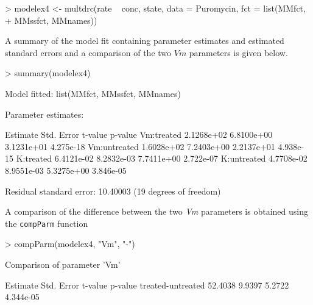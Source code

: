 \documentclass[a4paper]{article}
\begin{document}
\begin{Schunk}
\begin{Sinput}
> modelex4 <- multdrc(rate ~ conc, state, data = Puromycin, fct = list(MMfct, 
+     MMssfct, MMnames))
\end{Sinput}
\end{Schunk}
A summary of the model fit containing parameter estimates and estimated standard errors and a comparison of the two $Vm$ parameters is given below.

\begin{Schunk}
\begin{Sinput}
> summary(modelex4)
\end{Sinput}
\begin{Soutput}
Model fitted: list(MMfct, MMssfct, MMnames)

Parameter estimates:

               Estimate Std. Error    t-value   p-value
Vm:treated   2.1268e+02 6.8100e+00 3.1231e+01 4.275e-18
Vm:untreated 1.6028e+02 7.2403e+00 2.2137e+01 4.938e-15
K:treated    6.4121e-02 8.2832e-03 7.7411e+00 2.722e-07
K:untreated  4.7708e-02 8.9551e-03 5.3275e+00 3.846e-05

Residual standard error: 10.40003 (19 degrees of freedom)
\end{Soutput}
\end{Schunk}
A comparison of the difference between the two \emph{Vm} parameters is obtained using the \verb+compParm+ function
\begin{Schunk}
\begin{Sinput}
> compParm(modelex4, "Vm", "-")
\end{Sinput}
\begin{Soutput}
Comparison of parameter 'Vm' 

                  Estimate Std. Error t-value   p-value
treated-untreated  52.4038     9.9397  5.2722 4.344e-05
\end{Soutput}
\end{Schunk}



\end{document}
